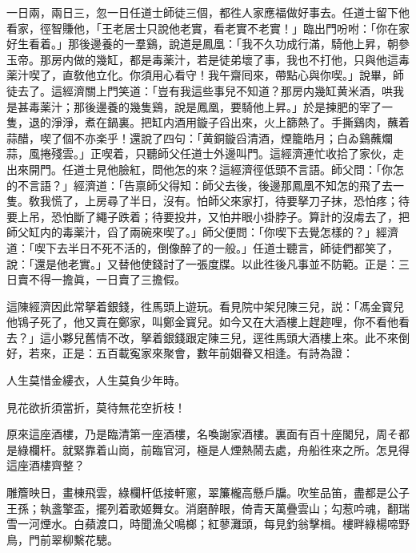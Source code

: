 一日兩，兩日三，忽一日任道士師徒三個，都徃人家應福做好事去。任道士留下他看家，徑智賺他，「王老居士只說他老實，看老實不老實！」臨出門吩咐：「你在家好生看着。」那後邊養的一羣鷄，說道是鳳凰：「我不久功成行滿，騎他上昇，朝參玉帝。那房内做的幾缸，都是毒薬汁，若是徒弟壞了事，我也不打他，只與他這毒薬汁喫了，直敎他立化。你須用心看守！我午齋囘來，帶點心與你喫。」說畢，師徒去了。這經濟關上門笑道：「豈有我這些事兒不知道？那房内幾缸黄米酒，哄我是甚毒薬汁；那後邊養的幾隻鷄，說是鳳凰，要騎他上昇。」於是揀肥的宰了一隻，退的淨淨，煮在鍋裏。把缸内酒用鏇子舀出來，火上篩熱了。手撕鷄肉，蘸着蒜醋，喫了個不亦楽乎！還說了四句：「黄銅鏇舀清酒，煙籠皓月；白ゐ鷄蘸爛蒜，風捲殘雲。」正喫着，只聽師父任道士外邊叫門。這經濟連忙收拾了家伙，走出來開門。任道士見他臉紅，問他怎的來？這經濟徑低頭不言語。師父問：「你怎的不言語？」經濟道：「告禀師父得知：師父去後，後邊那鳳凰不知怎的飛了去一隻。敎我慌了，上房尋了半日，沒有。怕師父來家打，待要拏刀子抹，恐怕疼；待要上吊，恐怕斷了繩子跌着；待要投井，又怕井眼小掛脖子。算計的沒䖏去了，把師父缸内的毒薬汁，舀了兩碗來喫了。」師父便問：「你喫下去覺怎樣的？」經濟道：「喫下去半日不死不活的，倒像醉了的一般。」任道士聽言，師徒們都笑了，說：「還是他老實。」又替他使錢討了一張度牒。以此徃後凡事並不防範。正是：三日賣不得一擔眞，一日賣了三擔假。

這陳經濟因此常拏着銀錢，徃馬頭上遊玩。看見院中架兒陳三兒，説：「馮金寳兒他鴇子死了，他又賣在鄭家，叫鄭金寳兒。如今又在大酒樓上趕趂哩，你不看他看去？」這小夥兒舊情不改，拏着銀錢跟定陳三兒，逕徃馬頭大酒樓上來。此不來倒好，若來，正是：五百載寃家來聚會，數年前姻眷又相逢。有詩為證：

\begin{myquote}
人生莫惜金縷衣，人生莫負少年時。

見花欲折須當折，莫待無花空折枝！
\end{myquote}

原來這座酒樓，乃是臨清第一座酒樓，名喚謝家酒樓。裏面有百十座閣兒，周そ都是綠欄杆。就緊靠着山崗，前臨官河，極是人煙熱鬧去處，舟船徃來之所。怎見得這座酒樓齊整？

\begin{myquote}
雕簷映日，畫棟飛雲，綠欄杆低接軒窻，翠簾櫳高懸戶牖。吹笙品笛，盡都是公子王孫；執盞擎盃，擺列着歌姬舞女。消磨醉眼，倚青天萬疊雲山；勾惹吟魂，翻瑞雪一河煙水。白蘋渡口，時聞漁父鳴榔；紅蓼灘頭，每見釣翁擊楫。樓畔綠楊啼野鳥，門前翠柳繫花驄。
\end{myquote}

